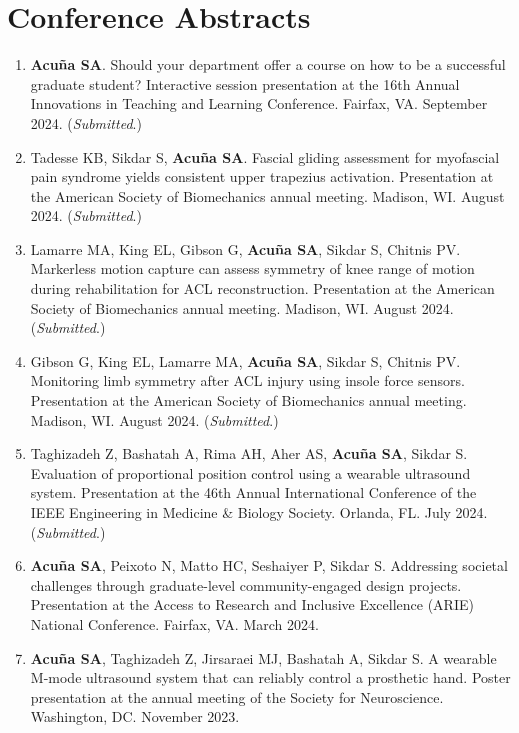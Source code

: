 \documentclass[letterpaper, 10pt]{article}
\begin{document}
\section{Conference Abstracts}
\begin{enumerate}
    \item \textbf{Acuña SA}. Should your department offer a course on how to be a successful graduate student? Interactive session presentation at the 16th Annual Innovations in Teaching and Learning Conference. Fairfax, VA. September 2024. (\textit{Submitted}.)
    \item Tadesse KB, Sikdar S, \textbf{Acuña SA}. Fascial gliding assessment for myofascial pain syndrome yields consistent upper trapezius activation. Presentation at the American Society of Biomechanics annual meeting. Madison, WI. August 2024. (\textit{Submitted}.)
    \item Lamarre MA, King EL, Gibson G, \textbf{Acuña SA}, Sikdar S, Chitnis PV. Markerless motion capture can assess symmetry of knee range of motion during rehabilitation for ACL reconstruction. Presentation at the American Society of Biomechanics annual meeting. Madison, WI. August 2024. (\textit{Submitted}.)
    \item Gibson G, King EL, Lamarre MA, \textbf{Acuña SA}, Sikdar S, Chitnis PV. Monitoring limb symmetry after ACL injury using insole force sensors. Presentation at the American Society of Biomechanics annual meeting. Madison, WI. August 2024. (\textit{Submitted}.)   
    \item Taghizadeh Z, Bashatah A, Rima AH, Aher AS, \textbf{Acuña SA}, Sikdar S. Evaluation of proportional position control using a wearable ultrasound system. Presentation at the 46th Annual International Conference of the IEEE Engineering in Medicine \& Biology Society. Orlanda, FL. July 2024. (\textit{Submitted}.)
    \item \textbf{Acuña SA}, Peixoto N, Matto HC, Seshaiyer P, Sikdar S. Addressing societal challenges through graduate-level community-engaged design projects. Presentation at the Access to Research and Inclusive Excellence (ARIE) National Conference. Fairfax, VA. March 2024.
    \item \textbf{Acuña SA}, Taghizadeh Z, Jirsaraei MJ, Bashatah A, Sikdar S. A wearable M-mode ultrasound system that can reliably control a prosthetic hand. Poster presentation at the annual meeting of the Society for Neuroscience. Washington, DC. November 2023.

\end{enumerate}
\end{document}
